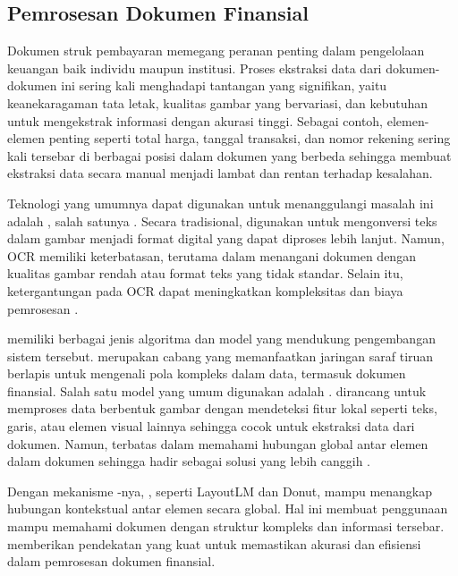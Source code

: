 \subsection{Pemrosesan Dokumen Finansial}
\label{subsec:pemrosesan-dokumen-finansial}

Dokumen struk pembayaran memegang peranan penting dalam pengelolaan
keuangan baik individu maupun institusi. Proses ekstraksi data dari dokumen-dokumen ini sering kali menghadapi tantangan yang signifikan, yaitu keanekaragaman tata letak, kualitas gambar yang bervariasi, dan kebutuhan untuk mengekstrak informasi dengan akurasi tinggi. Sebagai contoh, elemen-elemen penting seperti total harga, tanggal transaksi, dan nomor rekening sering kali tersebar di berbagai posisi dalam dokumen yang berbeda sehingga membuat ekstraksi data secara manual menjadi lambat dan rentan terhadap kesalahan.

Teknologi yang umumnya dapat digunakan untuk menanggulangi masalah ini adalah \cv{}, salah satunya \ocr. Secara tradisional, \ocr{} digunakan untuk mengonversi teks dalam gambar menjadi format digital yang dapat diproses lebih lanjut. Namun, OCR memiliki
keterbatasan, terutama dalam menangani dokumen dengan kualitas gambar rendah atau format teks yang tidak standar. Selain itu, ketergantungan pada OCR dapat meningkatkan kompleksitas dan biaya pemrosesan \parencite{kim2021donut}.

\dlfl{} memiliki berbagai jenis algoritma dan model yang mendukung pengembangan sistem tersebut. \dlfl{} merupakan cabang \ml{} yang memanfaatkan jaringan saraf tiruan berlapis untuk mengenali pola kompleks dalam data, termasuk dokumen finansial. Salah satu model yang umum digunakan adalah \cnn. \cnn{} dirancang untuk memproses data berbentuk gambar dengan mendeteksi fitur lokal seperti teks, garis, atau elemen visual lainnya sehingga \linebreak cocok untuk ekstraksi data dari dokumen. Namun, \cnn{} terbatas dalam memahami hubungan global antar
elemen dalam dokumen sehingga \transformer{} hadir sebagai solusi yang lebih canggih \parencite{alzubaidi2021review}.

Dengan mekanisme \attention-nya, \transformer{}, seperti LayoutLM dan
Donut, mampu menangkap hubungan kontekstual antar elemen secara global. Hal ini membuat penggunaan \transformer{} mampu memahami dokumen dengan struktur kompleks dan informasi tersebar. \transformer{} memberikan pendekatan yang kuat untuk memastikan akurasi dan efisiensi dalam pemrosesan dokumen finansial.